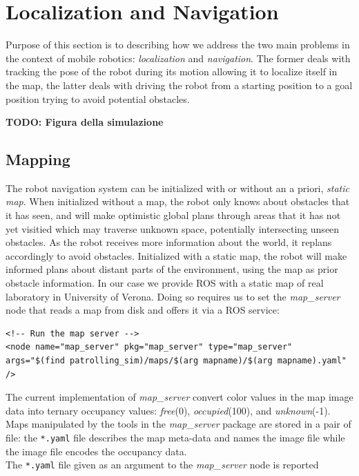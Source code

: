
\section{Localization and Navigation} \label{ros:navloc}
Purpose of this section is to describing how we address the two main problems in
the context of mobile robotics: \textit{localization} and \textit{navigation}.
The former deals with tracking the pose of the robot during its motion allowing
it to localize itself in the map, the latter deals with driving the robot from a 
starting position to a goal position trying to avoid potential obstacles.

{\bf TODO: Figura della simulazione}
\newpage
\subsection{Mapping}
The robot navigation system can be initialized with or without an a priori, \textit{static map}.
When initialized without a map, the robot only knows about obstacles that it has seen,
and will make optimistic global plans through areas that it has not yet visitied
which may traverse unknown space, potentially intersecting unseen obstacles. 
As the robot receives more information about the world, it replans accordingly to
avoid obstacles. Initialized with a static map, the robot will make informed plans 
about distant parts of the environment, using the map as prior obstacle information.
In our case we provide ROS with a static map of real laboratory in University of Verona.
Doing so requires us to set the \textit{map\_server} node that reads a map from 
disk and offers it via a ROS service:
\begin{lstlisting}
<!-- Run the map server -->
<node name="map_server" pkg="map_server" type="map_server" 
args="$(find patrolling_sim)/maps/$(arg mapname)/$(arg mapname).yaml" />
\end{lstlisting}
The current implementation of \textit{map\_server} convert color values in the map 
image data into ternary occupancy values: \textit{free}(0), \textit{occupied}(100), and
\textit{unknown}(-1).
\\
Maps manipulated by the tools in the \textit{map\_server} package are stored in a 
pair of file: the \texttt{*.yaml} file describes the map meta-data and names the image 
file while the image file encodes the occupancy data.
\\
The \texttt{*.yaml} file given as an argument to the \textit{map\_server} node is reported
